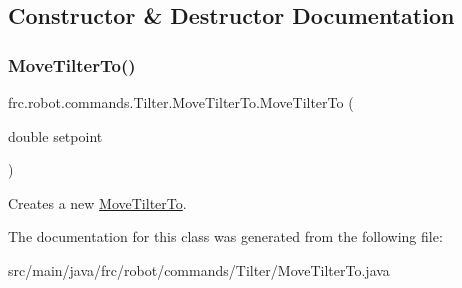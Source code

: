 \subsection{Constructor \& Destructor Documentation}
\mbox{\label{classfrc_1_1robot_1_1commands_1_1_tilter_1_1_move_tilter_to_a6e1d8a18c1622969836f2c8fb817aeeb}} 
\subsubsection{\texorpdfstring{MoveTilterTo()}{MoveTilterTo()}}
{\footnotesize\ttfamily frc.\+robot.\+commands.\+Tilter.\+Move\+Tilter\+To.\+Move\+Tilter\+To (\begin{DoxyParamCaption}\item[{double}]{setpoint }\end{DoxyParamCaption})\hspace{0.3cm}{\ttfamily [inline]}}

Creates a new \mbox{\hyperlink{classfrc_1_1robot_1_1commands_1_1_tilter_1_1_move_tilter_to}{Move\+Tilter\+To}}. 

The documentation for this class was generated from the following file\+:\begin{DoxyCompactItemize}
\item 
src/main/java/frc/robot/commands/\+Tilter/Move\+Tilter\+To.\+java\end{DoxyCompactItemize}
